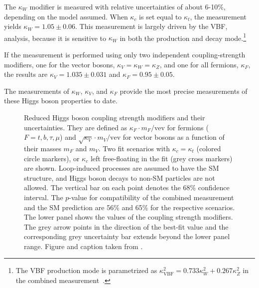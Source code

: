 The $\kappa_W$ modifier is measured with relative uncertainties of about 6-10\%, depending on the model assumed. 
When $\kappa_c$ is set equal to $\kappa_t$, the measurement yields $\kappa_W = 1.05 \pm 0.06$.
This measurement is largely driven by the VBF, \HWW analysis, because it is sensitive to $\kappa_W$ in both the production and decay mode.\footnote{The VBF production mode is parametrized as $\kappa_\mathrm{VBF}^2 = 0.733 \kappa^2_W + 0.267 \kappa^2_Z$ in the combined measurement~\cite{NaturePaper}.}

If the measurement is performed using only two independent coupling-strength modifiers, one for the vector bosons, $\kappa_V = \kappa_W = \kappa_Z$, and one for all fermions, $\kappa_F$, the results are $\kappa_V = 1.035 \pm 0.031$ and $\kappa_F = 0.95 \pm 0.05$. 

The measurements of $\kappa_W$, $\kappa_V$, and $\kappa_F$ provide the most precise measurements of these Higgs boson properties to date.

\begin{figure}
    \caption[Reduced Higgs boson coupling strength modifiers and their uncertainties.]{
      Reduced Higgs boson coupling strength modifiers and their uncertainties. They are defined as $\kappa_F \cdot m_F / \text{vev}$ for fermions
  ($F=t,b,\tau,\mu$) and $\sqrt{\kappa_V}\cdot m_V/\text{vev}$ for vector bosons as a
  function of their masses $m_F$ and $m_V$. Two fit scenarios with $\kappa_c =
  \kappa_t$ (colored circle markers), or $\kappa_c$ left free-floating in the fit (grey
  cross markers) are shown. Loop-induced processes are assumed to have the SM structure, and Higgs boson decays to non-SM particles are not allowed. The vertical bar on each point denotes the 68\% confidence interval. The $p$-value for compatibility of the combined measurement and the SM prediction are 56\% and 65\% for the respective scenarios. The lower panel shows the values of the coupling strength modifiers. The grey arrow points in the direction of the best-fit value and the corresponding grey uncertainty bar extends beyond the lower panel range. Figure and caption taken from .}
    \label{fig:h-couplings}
\end{figure}